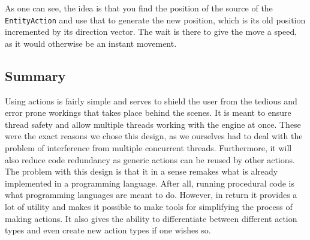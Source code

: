 As one can see, the idea is that you find the position of the source
of the \texttt{EntityAction} and use that to generate the new position,
which is its old position incremented by its direction vector. The
wait is there to give the move a speed, as it would otherwise be an
instant movement.


\subsection{Summary}

Using actions is fairly simple and serves to shield the user from
the tedious and error prone workings that takes place behind the scenes.
It is meant to ensure thread safety and allow multiple threads working
with the engine at once. These were the exact reasons we chose this
design, as we ourselves had to deal with the problem of interference
from multiple concurrent threads. Furthermore, it will also reduce
code redundancy as generic actions can be reused by other actions.
The problem with this design is that it in a sense remakes what is
already implemented in a programming language. After all, running
procedural code is what programming languages are meant to do. However,
in return it provides a lot of utility and makes it possible to make
tools for simplifying the process of making actions. It also gives
the ability to differentiate between different action types and even
create new action types if one wishes so.

